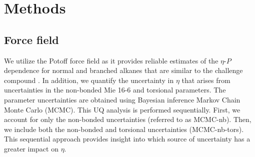 \documentclass[preprint,review,12pt]{elsarticle}
\begin{document}
	\section{Methods} \label{Methods}
	
		\subsection{Force field} \label{Force Field}
	
	We utilize the Potoff force field as it provides reliable estimates of the $\eta$-$P$ dependence for normal and branched alkanes that are similar to the challenge compound \cite{Postdoc_3}. In addition, we quantify the uncertainty in $\eta$ that arises from uncertainties in the non-bonded Mie 16-6 and torsional parameters. The parameter uncertainties are obtained using Bayesian inference Markov Chain Monte Carlo (MCMC). This UQ analysis is performed sequentially. First, we account for only the non-bonded uncertainties (referred to as MCMC-nb). Then, we include both the non-bonded and torsional uncertainties (MCMC-nb-tors). This sequential approach provides insight into which source of uncertainty has a greater impact on $\eta$.
	
	
	
	
\end{document}
